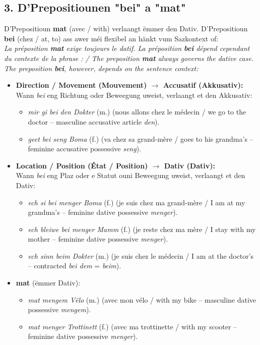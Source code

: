 \subsection*{3. D'Prepositiounen "bei" a "mat"}

D'Prepositioun \textbf{mat} (avec / with) verlaangt ëmmer den Dativ. D'Prepositioun \textbf{bei} (chez / at, to) ass awer méi flexibel an hänkt vum Sazkontext of: \\
\textit{La préposition \textbf{mat} exige toujours le datif. La préposition \textbf{bei} dépend cependant du contexte de la phrase : / The preposition \textbf{mat} always governs the dative case. The preposition \textbf{bei}, however, depends on the sentence context:}

\begin{itemize}
    \item \textbf{Direction / Movement (Mouvement) $\rightarrow$ Accusatif (Akkusativ):} \\
    Wann \textit{bei} eng Richtung oder Beweegung uweist, verlaangt et den Akkusativ:
    \begin{itemize}
        \item \textit{mir gi bei den Dokter} (m.) (nous allons chez le médecin / we go to the doctor -- masculine accusative article \textit{den}).
        \item \textit{geet bei seng Boma} (f.) (va chez sa grand-mère / goes to his grandma's -- feminine accusative possessive \textit{seng}).
    \end{itemize}
    
    \item \textbf{Location / Position (État / Position) $\rightarrow$ Dativ (Dativ):} \\
    Wann \textit{bei} eng Plaz oder e Statut ouni Beweegung uweist, verlaangt et den Dativ:
    \begin{itemize}
        \item \textit{ech si bei menger Boma} (f.) (je suis chez ma grand-mère / I am at my grandma's -- feminine dative possessive \textit{menger}).
        \item \textit{ech bleiwe bei menger Mamm} (f.) (je reste chez ma mère / I stay with my mother -- feminine dative possessive \textit{menger}).
        \item \textit{ech sinn beim Dokter} (m.) (je suis chez le médecin / I am at the doctor's -- contracted \textit{bei dem} = \textit{beim}).
    \end{itemize}
    
    \item \textbf{mat} (ëmmer Dativ):
    \begin{itemize}
        \item \textit{mat mengem Vëlo} (m.) (avec mon vélo / with my bike -- masculine dative possessive \textit{mengem}).
        \item \textit{mat menger Trottinett} (f.) (avec ma trottinette / with my scooter -- feminine dative possessive \textit{menger}).
    \end{itemize}
\end{itemize}

